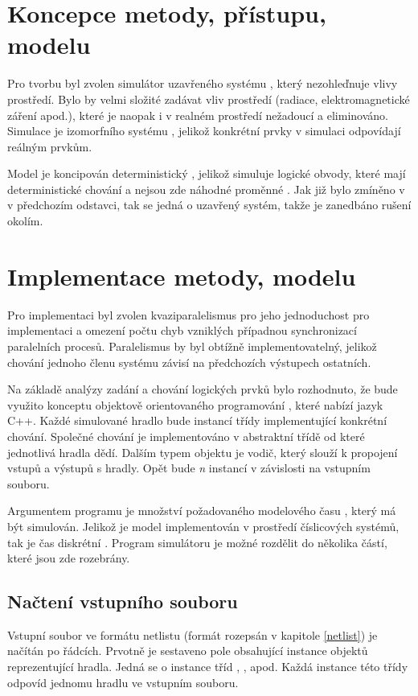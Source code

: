 \documentclass[11pt,a4paper]{article}
\begin{document}
	\section{Koncepce metody, přístupu, modelu}

		Pro tvorbu byl zvolen simulátor uzavřeného systému , který nezohleďnuje vlivy prostředí. Bylo by velmi složité zadávat vliv prostředí (radiace, elektromagnetické záření apod.), které je naopak i v realném prostředí nežadoucí a eliminováno. Simulace je izomorfního systému , jelikož konkrétní prvky v simulaci odpovídají reálným prvkům.

		Model je koncipován deterministický , jelikož simuluje logické obvody, které mají deterministické chování a nejsou zde náhodné proměnné . Jak již bylo zmíněno v v předchozím odstavci, tak se jedná o uzavřený systém, takže je zanedbáno rušení okolím.


	\section{Implementace metody, modelu}

		Pro implementaci byl zvolen kvaziparalelismus  pro jeho jednoduchost pro implementaci a omezení počtu chyb vzniklých případnou synchronizací paralelních procesů. Paralelismus by byl obtížně implementovatelný, jelikož chování jednoho členu systému závisí na předchozích výstupech ostatních.

		Na základě analýzy zadání a chování logických prvků bylo rozhodnuto, že bude využito konceptu objektově orientovaného programování , které nabízí jazyk C++. Každé simulované hradlo bude instancí třídy implementující konkrétní chování. Společné chování je implementováno v abstraktní třídě od které jednotlivá hradla dědí. Dalším typem objektu je vodič, který slouží k propojení vstupů a výstupů s hradly. Opět bude \textit{n} instancí v závislosti na vstupním souboru.

		Argumentem programu je množství požadovaného modelového času , který má být simulován. Jelikož je model implementován v prostředí číslicových systémů, tak je čas diskrétní . Program simulátoru je možné rozdělit do několika částí, které jsou zde rozebrány.

		\subsection{Načtení vstupního souboru}
			Vstupní soubor ve formátu netlistu (formát rozepsán v kapitole \ref{netlist}) je načítán po řádcích. Prvotně je sestaveno pole obsahující instance objektů reprezentující hradla. Jedná se o instance tříd , ,  apod. Každá instance této třídy odpovíd jednomu hradlu ve vstupním souboru.
\end{document}
